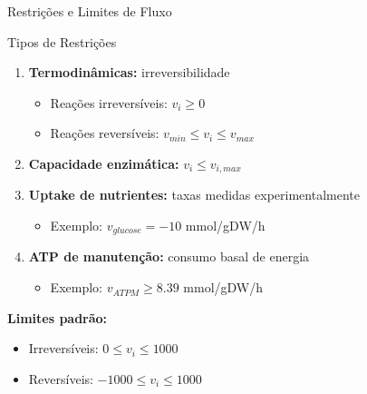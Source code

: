 \begin{frame}{Restrições e Limites de Fluxo}
\begin{block}{Tipos de Restrições}
\begin{enumerate}
    \item \textbf{Termodinâmicas:} irreversibilidade
    \begin{itemize}
        \item Reações irreversíveis: $v_i \geq 0$
        \item Reações reversíveis: $v_{min} \leq v_i \leq v_{max}$
    \end{itemize}

    \item \textbf{Capacidade enzimática:} $v_i \leq v_{i,max}$

    \item \textbf{Uptake de nutrientes:} taxas medidas experimentalmente
    \begin{itemize}
        \item Exemplo: $v_{glucose} = -10$ mmol/gDW/h
    \end{itemize}

    \item \textbf{ATP de manutenção:} consumo basal de energia
    \begin{itemize}
        \item Exemplo: $v_{ATPM} \geq 8.39$ mmol/gDW/h
    \end{itemize}
\end{enumerate}
\end{block}

\textbf{Limites padrão:}
\begin{itemize}
    \item Irreversíveis: $0 \leq v_i \leq 1000$
    \item Reversíveis: $-1000 \leq v_i \leq 1000$
\end{itemize}
\end{frame}

